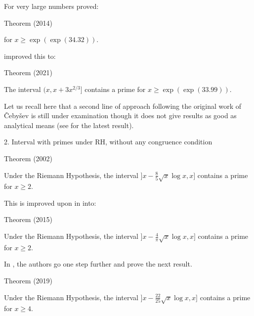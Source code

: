 For very large numbers 
\cite{Dudek*16b} 
proved:

\begin{thm}{Theorem (2014)}

  for $x \ge \exp(\exp(34.32)).$



 

\cite{Cully*21}
improved this to:

Theorem (2021)

 The interval $(x, x + 3x^{2/3}]$ contains a prime
  for $x \ge \exp(\exp(33.99)).$



\par 

Let us recall here that a second line of approach following the original
work of \v Ceby\v sev is still under examination though it does not give
results as good
as analytical means (see
\cite{CostaPereira*89}
for the latest result).





  
2. Interval with primes under RH, without any congruence condition



\par Theorem (2002)


Under the Riemann Hypothesis, the interval $\bigl]x-\tfrac85\sqrt{x}\log x,x\bigr]$
contains a prime for $x\ge2$.
\end{thm}

This is improved upon
in \cite{Dudek*15} into:
\begin{thm}{Theorem (2015)}

Under the Riemann Hypothesis, the interval $\bigl]x-\tfrac4{\pi}\sqrt{x}\log x,x\bigr]$
contains a prime for $x\ge2$.
\end{thm}


In \cite{Carneiro-Milinovich-Soundararajan*19}, the authors go one step further and prove the next result.
\begin{thm}{Theorem (2019)}

Under the Riemann Hypothesis, the interval $\bigl]x-\tfrac{22}{25}\sqrt{x}\log x,x\bigr]$
contains a prime for $x\ge4$.
\end{thm}



\par 








